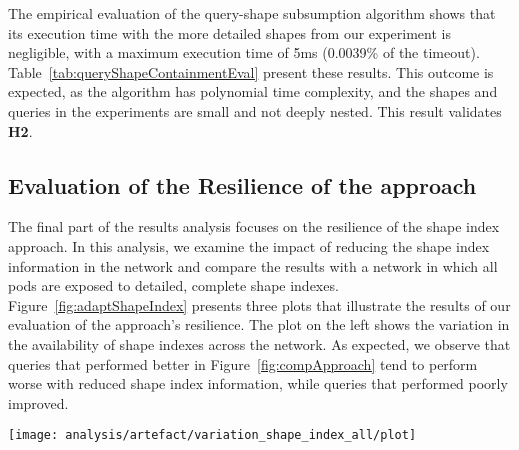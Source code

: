 The empirical evaluation of the query-shape subsumption algorithm shows that its execution time with the more detailed shapes from our experiment is negligible, with a maximum execution time of 5ms (0.0039\% of the timeout).
Table~\ref{tab:queryShapeContainmentEval} present these results.
This outcome is expected, as the algorithm has polynomial time complexity, and the shapes and queries in the experiments are small and not deeply nested.
This result validates \textbf{H2}.


\subsection{Evaluation of the Resilience of the approach}

The final part of the results analysis focuses on the resilience of the shape index approach.
In this analysis, we examine the impact of reducing the shape index information in the network and compare the results with a network in which all pods are exposed to detailed, complete shape indexes.
Figure~\ref{fig:adaptShapeIndex} presents three plots that illustrate the results of our evaluation of the approach's resilience.
The plot on the left shows the variation in the availability of shape indexes across the network. 
As expected, we observe that queries that performed better in Figure~\ref{fig:compApproach} tend to perform worse with reduced shape index information, while queries that performed poorly improved. 


\begin{figure*}
    \centering
    \texttt{[image: analysis/artefact/variation\_shape\_index\_all/plot]}
    \caption{
    Shape index approaches tend to perform less effectively with limited network information and comparatively better where the baseline shape index underperforms.
    A higher ratio indicates a longer query execution time compared to a network with complete shape index information (\textbf{lower is better}).
    }
    \label{fig:adaptShapeIndex}
\end{figure*}


